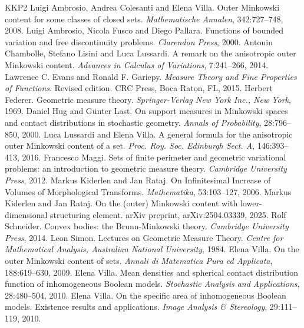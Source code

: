 \documentclass[pdflatex,sn-mathphys-num]{sn-jnl}
\theoremstyle{plain}
\theoremstyle{definition}
\begin{document}
\begin{thebibliography}{KKP2}
Luigi Ambrosio, Andrea Colesanti and Elena Villa. Outer {M}inkowski content for some classes of closed sets. \textit{Mathematische Annalen}, 342:727--748, 2008.
Luigi Ambrosio, Nicola Fusco and Diego Pallara. Functions of bounded variation and free discontinuity problems. \textit{Clarendon Press}, 2000.
 Antonin Chambolle, Stefano Lisini and Luca Lussardi. A remark on the anisotropic outer {M}inkowski content. \textit{Advances in Calculus of Variations}, 7:241--266, 2014.
Lawrence C. Evans and Ronald F. Gariepy. \textit{Measure Theory and Fine Properties of Functions}. Revised edition. CRC Press, Boca Raton, FL, 2015.
Herbert Federer. Geometric measure theory. \textit{ Springer-Verlag New York Inc., New York}, 1969.
 Daniel Hug and G\"unter Last. On support measures in Minkowski spaces and contact distributions in stochastic geometry. \textit{Annals of Probability}, 28:796--850, 2000.
Luca Lussardi and Elena Villa. A general formula for the anisotropic outer {M}inkowski content of a set. \textit{Proc. Roy. Soc. Edinburgh Sect. A}, 146:393--413, 2016.
Francesco Maggi. Sets of finite perimeter and geometric variational problems: an introduction to geometric measure theory.
\textit{Cambridge University Press}, 2012.
 Markus Kiderlen and Jan Rataj. On Infinitesimal Increase of Volumes of Morphological Transforms. \textit{Mathematika}, 53:103--127, 2006.
Markus Kiderlen and Jan Rataj. On the (outer) Minkowski content with lower-dimensional structuring element. arXiv preprint, arXiv:2504.03339, 2025.
 Rolf Schneider. Convex bodies: the Brunn-{M}inkowski theory. \textit{Cambridge University Press}, 2014.
Leon Simon. Lectures on Geometric Measure Theory. \textit{Centre for Mathematical Analysis, Australian National University}, 1984.
Elena Villa. On the outer {M}inkowski content of sets. \textit{Annali di Matematica Pura ed Applicata}, 188:619--630, 2009.
 Elena Villa. Mean densities and spherical contact distribution function of inhomogeneous Boolean models. \textit{Stochastic Analysis and Applications}, 28:480--504, 2010.
 Elena Villa. On the specific area of inhomogeneous Boolean models. Existence results and applications. \textit{Image Analysis \& Stereology}, 29:111--119, 2010.


\end{thebibliography}
\end{document}
